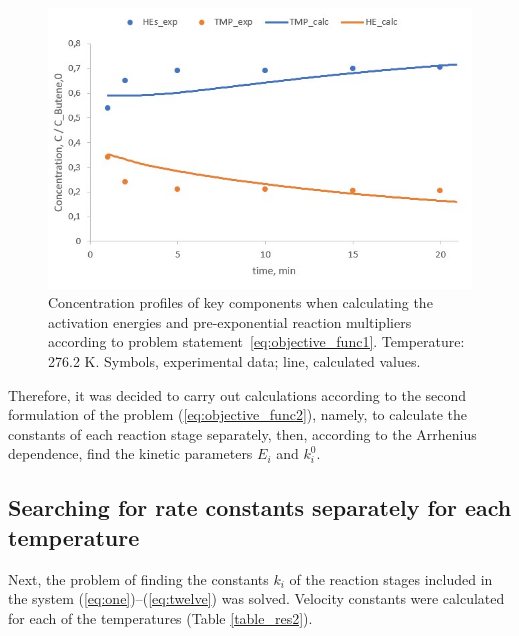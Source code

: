 \documentclass{svproc}
\begin{document}
\begin{figure}
\begin{center}
  \includegraphics[width=0.7\linewidth]{res1.jpg}
  \caption{Concentration profiles of key components when calculating the activation energies and pre-exponential reaction multipliers according to problem statement~\ref{eq:objective_func1}. Temperature: 276.2 K. Symbols, experimental data; line, calculated values.}
  \label{fig:res1}  
\end{center}
\end{figure}

Therefore, it was decided to carry out calculations according to the second formulation of the problem (\ref{eq:objective_func2}), namely, to calculate the constants of each reaction stage separately, then, according to the Arrhenius dependence, find the kinetic parameters $E_i$ and $k_i^0$.

\subsection{Searching for rate constants separately for each temperature}

Next, the problem of finding the constants $k_i$ of the reaction stages included in the system (\ref{eq:one})--(\ref{eq:twelve}) was solved. Velocity constants were calculated for each of the temperatures (Table \ref{table_res2}).
\end{document}
